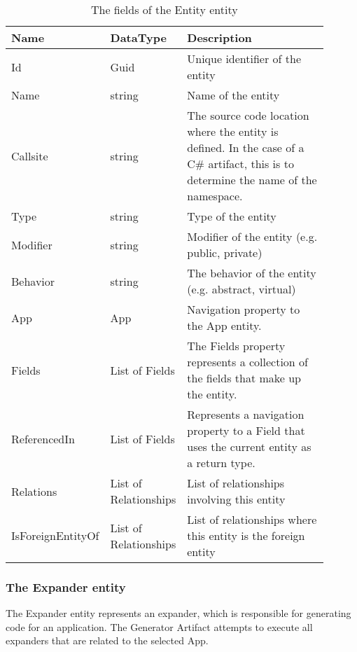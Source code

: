 \begin{table}[H]
\small
\begin{tabular}{ p{0.20\linewidth} p{0.23\linewidth} p{0.47\linewidth} }
\hline
\textbf{Name} & \textbf{DataType} & \textbf{Description} \\
\hline
Id & Guid & Unique identifier of the entity \\
Name & string & Name of the entity \\
Callsite & string & The source code location where the entity is defined. In the case of a C\#
artifact, this is to determine the name of the namespace.\\
Type & string & Type of the entity \\
Modifier & string & Modifier of the entity (e.g. public, private) \\
Behavior & string & The behavior of the entity (e.g. abstract, virtual) \\
App & App & Navigation property to the App entity. \\
Fields & List of Fields & The Fields property represents a collection of the fields that
make up the entity. \\
ReferencedIn & List of Fields & Represents a navigation property to a Field that uses the
current entity as a return type. \\
Relations & List of Relationships & List of relationships involving this entity \\
IsForeignEntityOf & List of Relationships & List of relationships where this entity is the foreign entity \\
\hline
\end{tabular}
\caption{The fields of the Entity entity}
\label{table:entity_entity}
\end{table}

\subsubsection{The Expander entity}

The Expander entity represents an expander, which is responsible for generating code for
an application. The Generator Artifact attempts to execute all expanders that are related
to the selected App.

